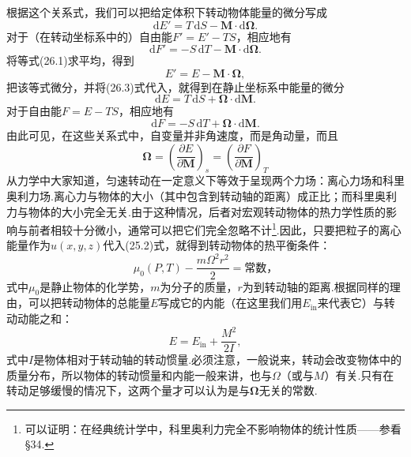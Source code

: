 根据这个关系式，我们可以把给定体积下转动物体能量的微分写成
\begin{equation}
  \mathrm{d}E'=T\,\mathrm{d}S-\boldsymbol{M}\cdot\mathrm{d}\boldsymbol{\Omega}.
\end{equation}
对于（在转动坐标系中的）自由能$F'=E'-TS$，相应地有
\begin{equation}
  \mathrm{d}F'=-S\,\mathrm{d}T-\boldsymbol{M}\cdot\mathrm{d}\boldsymbol{\Omega}.
\end{equation}
将等式(26.1)求平均，得到
\begin{equation}
  E'=E-\boldsymbol{M}\cdot\boldsymbol{\Omega},
\end{equation}
把该等式微分，并将(26.3)式代入，就得到在静止坐标系中能量的微分
\begin{equation}
  \mathrm{d}E=T\,\mathrm{d}S+\boldsymbol{\Omega}\cdot\mathrm{d}\boldsymbol{M}.
\end{equation}
对于自由能$F=E-TS$，相应地有
\begin{equation}
  \mathrm{d}F=-S\,\mathrm{d}T+\boldsymbol{\Omega}\cdot\mathrm{d}\boldsymbol{M}.
\end{equation}
由此可见，在这些关系式中，自变量并非角速度，而是角动量，而且
\begin{equation}
  \boldsymbol{\Omega}
  =\left(\frac{\partial E}{\partial\boldsymbol{M}}\right)_s
  =\left(\frac{\partial F}{\partial\boldsymbol{M}}\right)_T
\end{equation}
从力学中大家知道，匀速转动在一定意义下等效于呈现两个力场：离心力场和科里奥利力场.离心力与物体的大小（其中包含到转动轴的距离）成正比；而科里奥利力与物体的大小完全无关.由于这种情况，后者对宏观转动物体的热力学性质的影响与前者相较十分微小，通常可以把它们完全忽略不计\footnote{可以证明：在经典统计学中，科里奥利力完全不影响物体的统计性质——参看§34.}.因此，只要把粒子的离心能量作为$u(x,y,z)$代入(25.2)式，就得到转动物体的热平衡条件：
\begin{equation}
  \mu_0(P,T)-\frac{m\Omega^2r^2}{2}=\text{常数，}
\end{equation}
式中$\mu_0$是静止物体的化学势，$m$为分子的质量，$r$为到转动轴的距离.根据同样的理由，可以把转动物体的总能量$E$写成它的内能（在这里我们用$E_{\mathrm{in}}$来代表它）与转动动能之和：
\begin{equation}
  E=E_{\mathrm{in}}+\frac{M^2}{2I},
\end{equation}
式中$I$是物体相对于转动轴的转动惯量.必须注意，一般说来，转动会改变物体中的质量分布，所以物体的转动惯量和内能一般来讲，也与$\Omega$（或与$M$）有关.只有在转动足够缓慢的情况下，这两个量才可以认为是与$\boldsymbol{\Omega}$无关的常数.

